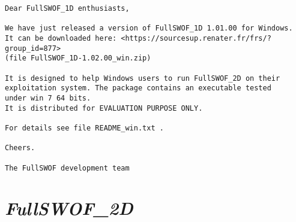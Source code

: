 \documentclass[a4paper, 11pt]{article}
\newcommand{\FullSWOFtwoD}{\emph{FullSWOF\_2D}}
\begin{document}
\begin{enumerate}
\begin{verbatim}
Dear FullSWOF_1D enthusiasts,

We have just released a version of FullSWOF_1D 1.01.00 for Windows.
It can be downloaded here: <https://sourcesup.renater.fr/frs/?group_id=877>
(file FullSWOF_1D-1.02.00_win.zip)

It is designed to help Windows users to run FullSWOF_2D on their 
exploitation system. The package contains an executable tested
under win 7 64 bits.
It is distributed for EVALUATION PURPOSE ONLY.

For details see file README_win.txt .

Cheers.

The FullSWOF development team 
\end{verbatim}
\end{enumerate}



\section{\FullSWOFtwoD{}}
\end{document}
